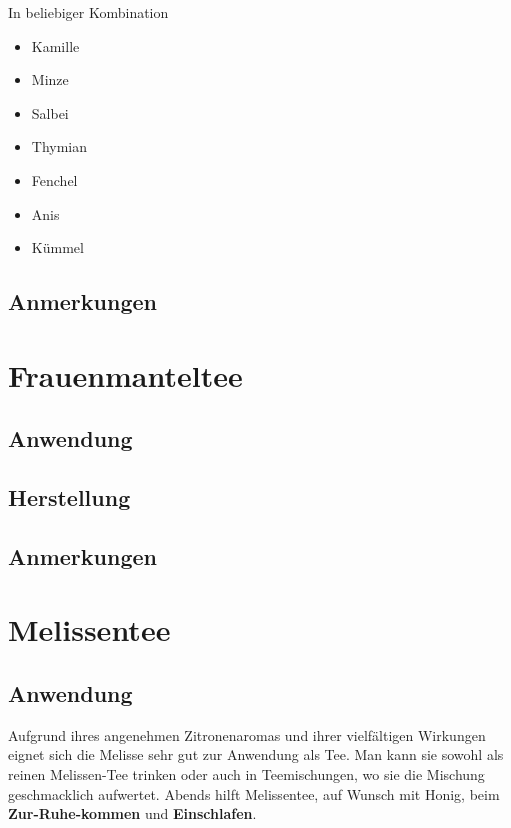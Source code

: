 In beliebiger Kombination

\begin{itemize}
	\item Kamille
	\item Minze
	\item Salbei
	\item Thymian
	\item Fenchel
	\item Anis
	\item Kümmel
\end{itemize}

\subsection{Anmerkungen}






\section{Frauenmanteltee}

\subsection{Anwendung}

\subsection{Herstellung}

\subsection{Anmerkungen}







\section{Melissentee}

\subsection{Anwendung}

Aufgrund ihres angenehmen Zitronenaromas und ihrer vielfältigen Wirkungen eignet sich die Melisse sehr gut zur Anwendung als Tee. Man kann sie sowohl als reinen Melissen-Tee trinken oder auch in Teemischungen, wo sie die Mischung geschmacklich aufwertet.
Abends hilft Melissentee, auf Wunsch mit Honig, beim \textbf{Zur-Ruhe-kommen} und \textbf{Einschlafen}.

